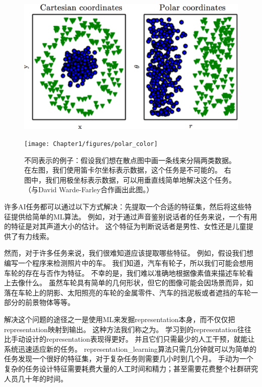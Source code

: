 \begin{figure}[!htb]
\ifOpenSource
\centerline{\includegraphics[scale=0.5]{images/1.png}}
\else
\centerline{\texttt{[image: Chapter1/figures/polar\_color]}}
\fi
\caption{不同表示的例子：假设我们想在散点图中画一条线来分隔两类数据。
在左图，我们使用笛卡尔坐标表示数据，这个任务是不可能的。 
右图中，我们用极坐标表示数据，可以用垂直线简单地解决这个任务。（与David Warde-Farley合作画出此图。）}
\label{fig:chap1_polar}
\end{figure}

许多\gls{AI}任务都可以通过以下方式解决：先提取一个合适的特征集，然后将这些特征提供给简单的\gls{ML}算法。
例如，对于通过声音鉴别说话者的任务来说，一个有用的特征是对其声道大小的估计。
这个特征为判断说话者是男性、女性还是儿童提供了有力线索。

然而，对于许多任务来说，我们很难知道应该提取哪些特征。
例如，假设我们想编写一个程序来检测照片中的车。
我们知道，汽车有轮子，所以我们可能会想用车轮的存在与否作为特征。
不幸的是，我们难以准确地根据像素值来描述车轮看上去像什么。
虽然车轮具有简单的几何形状，但它的图像可能会因场景而异，如落在车轮上的阴影、太阳照亮的车轮的金属零件、汽车的挡泥板或者遮挡的车轮一部分的前景物体等等。


解决这个问题的途径之一是使用\gls{ML}来发掘\gls{representation}本身，而不仅仅把\gls{representation}映射到输出。
这种方法我们称之为。
学习到的\gls{representation}往往比手动设计的\gls{representation}表现得更好。
并且它们只需最少的人工干预，就能让系统迅速适应新的任务。
\gls{representation_learning}算法只需几分钟就可以为简单的任务发现一个很好的特征集，对于复杂任务则需要几小时到几个月。
手动为一个复杂的任务设计特征需要耗费大量的人工时间和精力；甚至需要花费整个社群研究人员几十年的时间。

